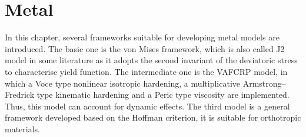 \chapter{Metal}
In this chapter, several frameworks suitable for developing metal models are introduced. The basic one is the von Mises framework, which is also called J2 model in some literature as it adopts the second invariant of the deviatoric stress to characterise yield function. The intermediate one is the VAFCRP model, in which a Voce type nonlinear isotropic hardening, a multiplicative Armstrong--Fredrick type kinematic hardening and a Peric type viscosity are implemented. Thus, this model can account for dynamic effects. The third model is a general framework developed based on the Hoffman criterion, it is suitable for orthotropic materials.




